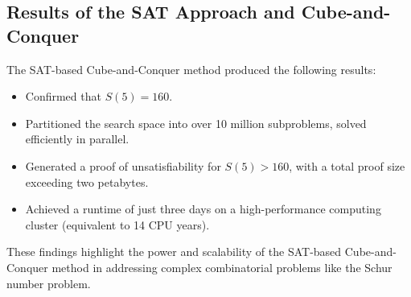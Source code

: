 \documentclass[12pt]{article}
\begin{document}
\subsection{Results of the SAT Approach and Cube-and-Conquer}
The SAT-based Cube-and-Conquer method produced the following results:
\begin{itemize}
    \item Confirmed that \( S(5) = 160 \).
    \item Partitioned the search space into over 10 million subproblems, solved efficiently in parallel.
    \item Generated a proof of unsatisfiability for \( S(5) > 160 \), with a total proof size exceeding two petabytes.
    \item Achieved a runtime of just three days on a high-performance computing cluster (equivalent to 14 CPU years).
\end{itemize}

These findings highlight the power and scalability of the SAT-based Cube-and-Conquer method in addressing complex combinatorial problems like the Schur number problem.
\end{document}
